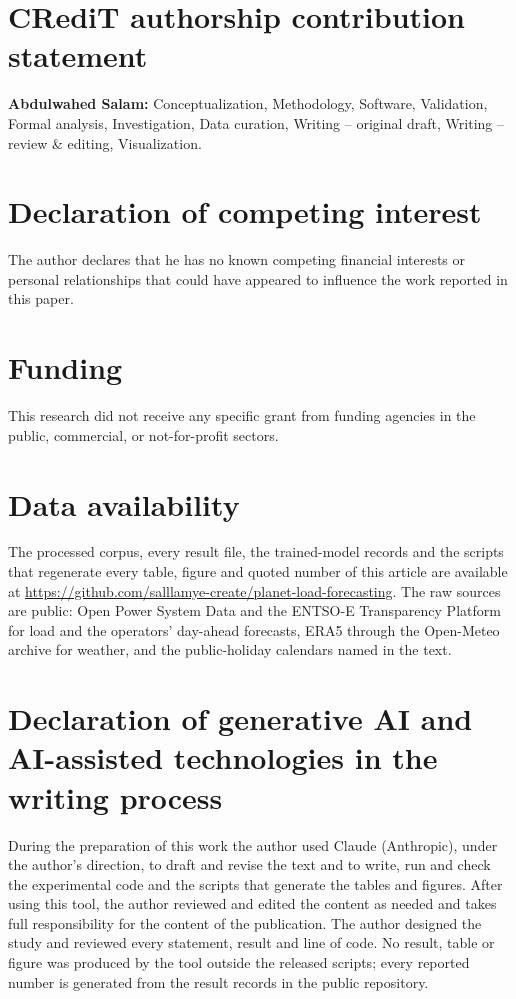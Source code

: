 \documentclass[preprint,12pt]{elsarticle}
\begin{document}
\linenumbers










\section*{CRediT authorship contribution statement}
\textbf{Abdulwahed Salam:} Conceptualization, Methodology, Software, Validation, Formal
analysis, Investigation, Data curation, Writing -- original draft, Writing -- review \&
editing, Visualization.

\section*{Declaration of competing interest}
The author declares that he has no known competing financial interests or personal
relationships that could have appeared to influence the work reported in this paper.

\section*{Funding}
This research did not receive any specific grant from funding agencies in the public,
commercial, or not-for-profit sectors.

\section*{Data availability}
The processed corpus, every result file, the trained-model records and the scripts that
regenerate every table, figure and quoted number of this article are available at
\url{https://github.com/salllamye-create/planet-load-forecasting}. The raw sources are public: Open Power System Data and the ENTSO-E
Transparency Platform for load and the operators' day-ahead forecasts, ERA5 through the
Open-Meteo archive for weather, and the public-holiday calendars named in the text.

\section*{Declaration of generative AI and AI-assisted technologies in the writing process}
During the preparation of this work the author used Claude (Anthropic), under the author's
direction, to draft and revise the text and to write, run and check the experimental code and
the scripts that generate the tables and figures. After using this tool, the author reviewed
and edited the content as needed and takes full responsibility for the content of the
publication. The author designed the study and reviewed every statement, result and line of
code. No result, table or figure was produced by the tool outside the released scripts; every
reported number is generated from the result records in the public repository.
\end{document}
